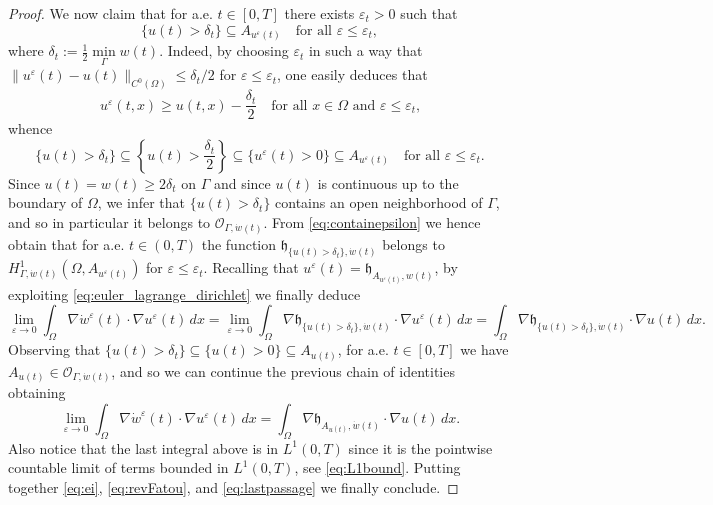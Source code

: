 \documentclass[a4paper,11pt,reqno]{amsart}
\numberwithin{equation}{section}
\theoremstyle{definition}
\theoremstyle{remark}
\begin{document}
\begin{proof}
    We now claim that for a.e. $t\in [0,T]$ there exists $\varepsilon_t>0$ such that
    \begin{equation}\label{eq:containepsilon}
        \{u(t)>\delta_t\}\subseteq A_{u^{\varepsilon}(t)}\quad\text{for all $\varepsilon\le \varepsilon_t$},
    \end{equation}
    where $\delta_t:= \frac12 \min\limits_\Gamma w(t)$. Indeed, by choosing $\varepsilon_t$ in such a way that $\|u^\varepsilon(t)-u(t)\|_{C^0(\Omega)}\le \delta_t/2$ for $\varepsilon\le \varepsilon_t$, one easily deduces that
    \begin{equation}
        u^\varepsilon(t,x)\ge u(t,x)-\frac{\delta_t}{2}\quad\text{for all $x\in \Omega$ and $\varepsilon\le \varepsilon_t$,}
    \end{equation}
    whence
    \begin{equation}
        \{u(t)>\delta_t\}\subseteq\left\{u(t)>\frac{\delta_t}{2}\right\}\subseteq\{u^\varepsilon(t)>0\}\subseteq A_{u^{\varepsilon}(t)}\quad\text{for all $\varepsilon\le \varepsilon_t$}.
    \end{equation}
    Since $u(t)=w(t)\ge 2\delta_t$ on $\Gamma$ and since $u(t)$ is continuous up to the boundary of $\Omega$, we infer that $\{u(t)>\delta_t\}$ contains an open neighborhood of $\Gamma$, and so in particular it belongs to $\mathcal O_{\Gamma,\dot w(t)}$. From \eqref{eq:containepsilon} we hence obtain that for a.e. $t\in (0,T)$ the function $\mathfrak{h}_{\{u(t)>\delta_t\},\dot w(t)}$ belongs to $H^1_{\Gamma,\dot w(t)}(\Omega, A_{u^{\varepsilon}(t)})$ for $\varepsilon\le \varepsilon_t$. Recalling that $u^\varepsilon(t)=\mathfrak{h}_{A_{u^\varepsilon(t)},w(t)}$, by exploiting \eqref{eq:euler_lagrange_dirichlet} we finally deduce
    \begin{equation}
        \lim\limits_{\varepsilon \to 0}\int_\Omega \nabla \dot w^\varepsilon(t)\cdot \nabla u^\varepsilon(t) \, dx =\lim\limits_{\varepsilon \to 0}\int_\Omega \nabla \mathfrak{h}_{\{u(t)>\delta_t\},\dot w(t)}\cdot \nabla u^\varepsilon(t) \, dx =\int_\Omega \nabla \mathfrak{h}_{\{u(t)>\delta_t\},\dot w(t)} \cdot \nabla u(t) \, dx. 
    \end{equation}
    Observing that $\{u(t)>\delta_t\}\subseteq \{u(t)>0\}\subseteq A_{u(t)}$, for a.e. $t\in [0,T]$ we have $A_{u(t)}\in \mathcal O_{\Gamma,\dot w(t)}$, and so we can continue the previous chain of identities obtaining
    \begin{equation}\label{eq:lastpassage}
        \lim\limits_{\varepsilon \to 0}\int_\Omega \nabla \dot w^\varepsilon(t)\cdot \nabla u^\varepsilon(t) \, dx =\int_\Omega \nabla \mathfrak{h}_{A_{u(t)},\dot w(t)} \cdot \nabla u(t) \, dx.
    \end{equation}
    Also notice that the last integral above is in $L^1(0,T)$ since it is the pointwise countable limit of terms bounded in $L^1(0,T)$, see \eqref{eq:L1bound}. Putting together \eqref{eq:ei}, \eqref{eq:revFatou}, and \eqref{eq:lastpassage} we finally conclude.
\end{proof}
\end{document}
